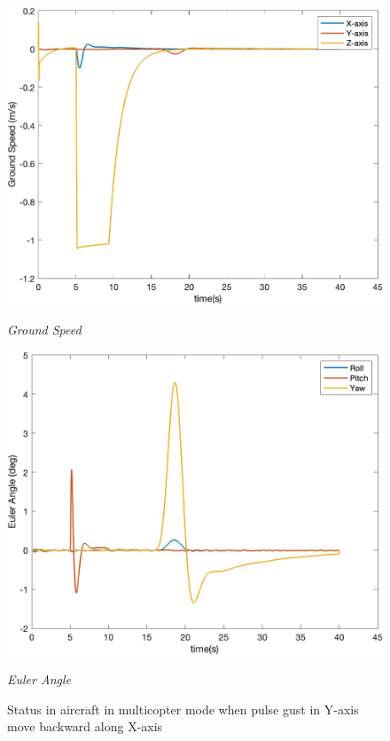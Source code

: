 \begin{figure}[htbp]
  \begin{minipage}[b]{0.45\textwidth}
    \centering
    \includegraphics[width=\textwidth]{Images/Gust/VTOL pulse/3 groundspeed_3.jpg}
    \caption*{\textit{Ground Speed}}
  \end{minipage}
  \hfil
  \begin{minipage}[b]{0.45\textwidth}
    \centering
    \includegraphics[width=\textwidth]{Images/Gust/VTOL pulse/4 EulerAngle_3.jpg}
    \caption*{\textit{Euler Angle}}
  \end{minipage}
  \caption{Status in aircraft in multicopter mode when pulse gust in Y-axis move backward along X-axis}
  \label{fig:VTOL pulse xy}
\end{figure}

